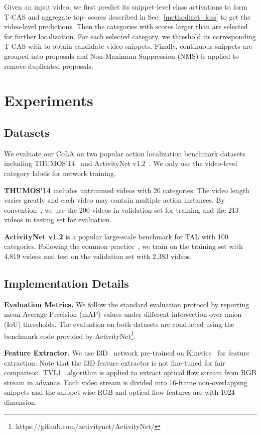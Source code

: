 \documentclass[final]{cvpr}
\begin{document}
Given an input video, we first predict its snippet-level class activations to form T-CAS and aggregate top- scores described in Sec.~\ref{method:act_loss} to get the video-level predictions. Then the categories with scores larger than  are selected for further localization. For each selected category, we threshold its corresponding T-CAS with  to obtain candidate video snippets. Finally, continuous snippets are grouped into proposals and Non-Maximum Suppression (NMS) is applied to remove duplicated proposals. \section{Experiments}

\subsection{Datasets}

We evaluate our CoLA on two popular action localization benchmark datasets including THUMOS'14~\cite{idrees2017thumos} and ActivityNet v1.2~\cite{caba2015activitynet}. We only use the video-level category labels for network training.

\textbf{THUMOS'14} includes untrimmed videos with 20 categories. The video length varies greatly and each video may contain multiple action instances. By convention~\cite{lee2020background,shi2020weakly}, we use the 200 videos in validation set for training and the 213 videos in testing set for evaluation.

\textbf{ActivityNet v1.2} is a popular large-scale benchmark for TAL with 100 categories. Following the common practice~\cite{wang2017untrimmednets,shou2018autoloc}, we train on the training set with 4,819 videos and test on the validation set with 2,383 videos.

\subsection{Implementation Details}

\textbf{Evaluation Metrics.} We follow the standard evaluation protocol by reporting mean Average Precision (mAP) values under different intersection over union (IoU) thresholds. The evaluation on both datasets are conducted using the benchmark code provided by ActivityNet\footnote{https://github.com/activitynet/ActivityNet/}.

\textbf{Feature Extractor.} We use I3D~\cite{carreira2017quo} network pre-trained on Kinetics~\cite{carreira2017quo} for feature extraction. Note that the I3D feature extractor is not fine-tuned for fair comparison. TVL1~\cite{perez2013tv} algorithm is applied to extract optical flow stream from RGB stream in advance. Each video stream is divided into 16-frame non-overlapping snippets and the snippet-wise RGB and optical flow features are with 1024-dimension.
\end{document}
